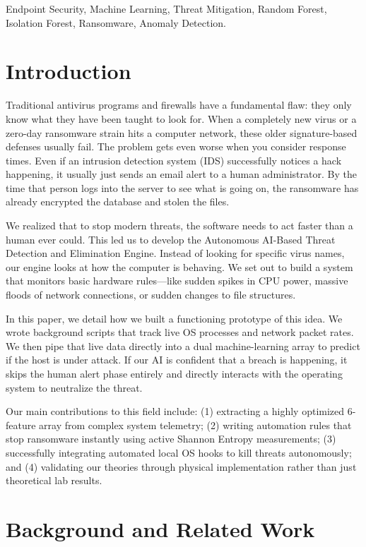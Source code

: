 \documentclass[conference]{IEEEtran}
\begin{document}
\begin{IEEEkeywords}
Endpoint Security, Machine Learning, Threat Mitigation, Random Forest, Isolation Forest, Ransomware, Anomaly Detection.
\end{IEEEkeywords}

\section{Introduction}

Traditional antivirus programs and firewalls have a fundamental flaw: they only know what they have been taught to look for. When a completely new virus or a zero-day ransomware strain hits a computer network, these older signature-based defenses usually fail. The problem gets even worse when you consider response times. Even if an intrusion detection system (IDS) successfully notices a hack happening, it usually just sends an email alert to a human administrator. By the time that person logs into the server to see what is going on, the ransomware has already encrypted the database and stolen the files. 

We realized that to stop modern threats, the software needs to act faster than a human ever could. This led us to develop the Autonomous AI-Based Threat Detection and Elimination Engine. Instead of looking for specific virus names, our engine looks at how the computer is behaving. We set out to build a system that monitors basic hardware rules—like sudden spikes in CPU power, massive floods of network connections, or sudden changes to file structures. 

In this paper, we detail how we built a functioning prototype of this idea. We wrote background scripts that track live OS processes and network packet rates. We then pipe that live data directly into a dual machine-learning array to predict if the host is under attack. If our AI is confident that a breach is happening, it skips the human alert phase entirely and directly interacts with the operating system to neutralize the threat.

Our main contributions to this field include: (1) extracting a highly optimized 6-feature array from complex system telemetry; (2) writing automation rules that stop ransomware instantly using active Shannon Entropy measurements; (3) successfully integrating automated local OS hooks to kill threats autonomously; and (4) validating our theories through physical implementation rather than just theoretical lab results.

\section{Background and Related Work}
\end{document}
